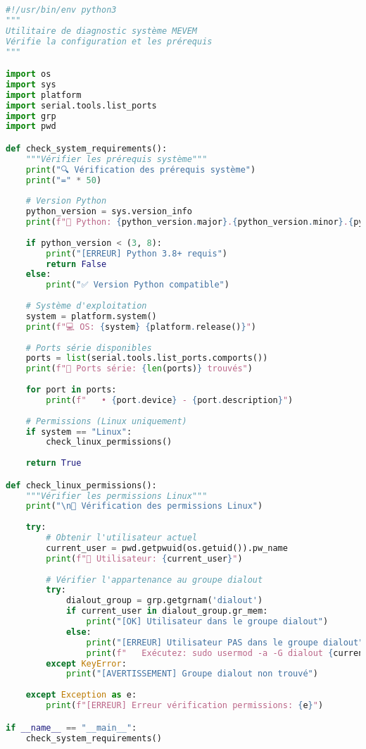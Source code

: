 \documentclass[12pt,a4paper]{article}
\begin{document}
\begin{lstlisting}[language=python, caption=Utilitaire de diagnostic système]
#!/usr/bin/env python3
"""
Utilitaire de diagnostic système MEVEM
Vérifie la configuration et les prérequis
"""

import os
import sys
import platform
import serial.tools.list_ports
import grp
import pwd

def check_system_requirements():
    """Vérifier les prérequis système"""
    print("🔍 Vérification des prérequis système")
    print("=" * 50)
    
    # Version Python
    python_version = sys.version_info
    print(f"🐍 Python: {python_version.major}.{python_version.minor}.{python_version.micro}")
    
    if python_version < (3, 8):
        print("[ERREUR] Python 3.8+ requis")
        return False
    else:
        print("✅ Version Python compatible")
    
    # Système d'exploitation
    system = platform.system()
    print(f"💻 OS: {system} {platform.release()}")
    
    # Ports série disponibles
    ports = list(serial.tools.list_ports.comports())
    print(f"🔌 Ports série: {len(ports)} trouvés")
    
    for port in ports:
        print(f"   • {port.device} - {port.description}")
    
    # Permissions (Linux uniquement)
    if system == "Linux":
        check_linux_permissions()
    
    return True

def check_linux_permissions():
    """Vérifier les permissions Linux"""
    print("\n🔐 Vérification des permissions Linux")
    
    try:
        # Obtenir l'utilisateur actuel
        current_user = pwd.getpwuid(os.getuid()).pw_name
        print(f"👤 Utilisateur: {current_user}")
        
        # Vérifier l'appartenance au groupe dialout
        try:
            dialout_group = grp.getgrnam('dialout')
            if current_user in dialout_group.gr_mem:
                print("[OK] Utilisateur dans le groupe dialout")
            else:
                print("[ERREUR] Utilisateur PAS dans le groupe dialout")
                print(f"   Exécutez: sudo usermod -a -G dialout {current_user}")
        except KeyError:
            print("[AVERTISSEMENT] Groupe dialout non trouvé")
    
    except Exception as e:
        print(f"[ERREUR] Erreur vérification permissions: {e}")

if __name__ == "__main__":
    check_system_requirements()
\end{lstlisting}
\end{document}
